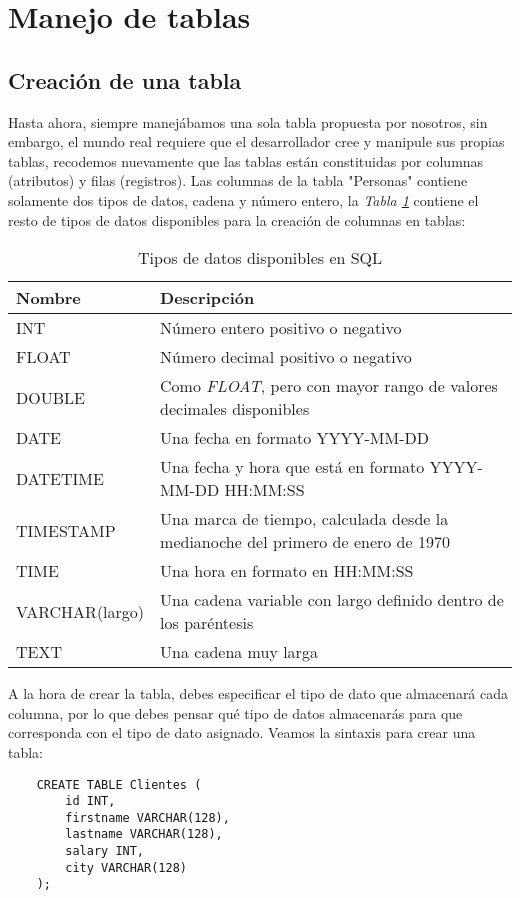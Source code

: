 \section{Manejo de tablas}


\subsection{Creación de una tabla}

Hasta ahora, siempre manejábamos una sola tabla propuesta por nosotros, sin embargo, el mundo real requiere que el desarrollador cree y manipule sus propias tablas, recodemos nuevamente que las tablas están constituidas por columnas (atributos) y filas (registros). Las columnas de la tabla "Personas" contiene solamente dos tipos de datos, cadena y número entero, la \textit{Tabla \ref{tab: 20}} contiene el resto de tipos de datos disponibles para la creación de columnas en tablas:
\begin{table}[H]
    \centering
    \caption{Tipos de datos disponibles en SQL}
    \label{tab: 20}
    \begin{tabular}{m{4cm} m{9cm}}
        \hline
        \textbf{Nombre} & \textbf{Descripción} \\
        \hline
        INT             & Número entero positivo o negativo \\
        FLOAT           & Número decimal positivo o negativo \\
        DOUBLE          & Como \textit{FLOAT}, pero con mayor rango de valores decimales disponibles \\
        DATE            & Una fecha en formato YYYY-MM-DD \\
        DATETIME        & Una fecha y hora que está en formato YYYY-MM-DD HH:MM:SS \\
        TIMESTAMP       & Una marca de tiempo, calculada desde la medianoche del primero de enero de 1970 \\
        TIME            & Una hora en formato en HH:MM:SS \\
        VARCHAR(largo)  & Una cadena variable con largo definido dentro de los paréntesis \\
        TEXT            & Una cadena muy larga \\
        \hline
    \end{tabular}
\end{table}

A la hora de crear la tabla, debes especificar el tipo de dato que almacenará cada columna, por lo que debes pensar qué tipo de datos almacenarás para que corresponda con el tipo de dato asignado. Veamos la sintaxis para crear una tabla:
\begin{lstlisting}
    CREATE TABLE Clientes (
        id INT,
        firstname VARCHAR(128),
        lastname VARCHAR(128),
        salary INT,
        city VARCHAR(128)
    );
\end{lstlisting}

